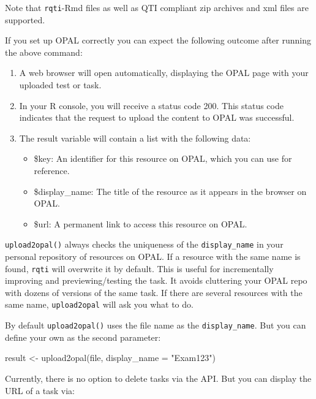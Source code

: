 \documentclass[twoside]{tufte-book}
\newenvironment{Shaded}{}{}
\newcommand{\AttributeTok}[1]{\textcolor[rgb]{0.49,0.56,0.16}{#1}}
\newcommand{\FunctionTok}[1]{\textcolor[rgb]{0.02,0.16,0.49}{#1}}
\newcommand{\NormalTok}[1]{#1}
\newcommand{\OtherTok}[1]{\textcolor[rgb]{0.00,0.44,0.13}{#1}}
\newcommand{\StringTok}[1]{\textcolor[rgb]{0.25,0.44,0.63}{#1}}
\providecommand{\tightlist}{%
  \setlength{\itemsep}{0pt}\setlength{\parskip}{0pt}}
\begin{document}
Note that \texttt{rqti}-Rmd files as well as QTI compliant zip archives and xml files are supported.

If you set up OPAL correctly you can expect the following outcome after running the above command:

\begin{enumerate}
\def\labelenumi{\arabic{enumi}.}
\tightlist
\item
  A web browser will open automatically, displaying the OPAL page with your uploaded test or task.
\item
  In your R console, you will receive a status code 200. This status code indicates that the request to upload the content to OPAL was successful.
\item
  The result variable will contain a list with the following data:

  \begin{itemize}
  \tightlist
  \item
    \$key: An identifier for this resource on OPAL, which you can use for reference.
  \item
    \$display\_name: The title of the resource as it appears in the browser on OPAL.
  \item
    \$url: A permanent link to access this resource on OPAL.
  \end{itemize}
\end{enumerate}

\texttt{upload2opal()} always checks the uniqueness of the \texttt{display\_name} in your personal repository of resources on OPAL. If a resource with the same name is found, \texttt{rqti} will overwrite it by default. This is useful for incrementally improving and previewing/testing the task. It avoids cluttering your OPAL repo with dozens of versions of the same task. If there are several resources with the same name, \texttt{upload2opal} will ask you what to do.

By default \texttt{upload2opal()} uses the file name as the \texttt{display\_name}. But you can define your own as the second parameter:

\begin{Shaded}
\begin{Highlighting}[]
\NormalTok{result }\OtherTok{\textless{}{-}} \FunctionTok{upload2opal}\NormalTok{(file, }\AttributeTok{display\_name =} \StringTok{"Exam123"}\NormalTok{)}
\end{Highlighting}
\end{Shaded}

Currently, there is no option to delete tasks via the API. But you can display the URL of a task via:
\end{document}
